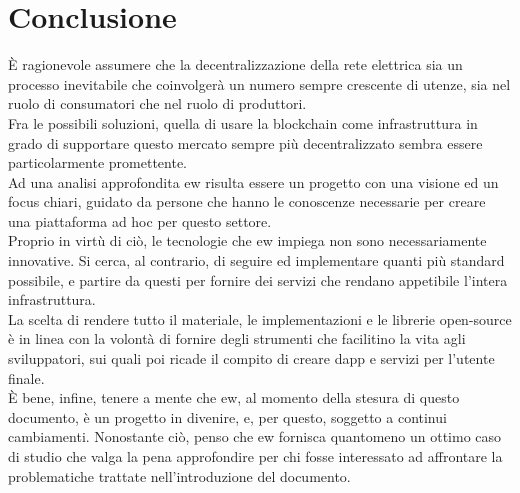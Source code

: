 \chapter*{Conclusione}
È ragionevole assumere che la decentralizzazione della rete elettrica sia un processo inevitabile che coinvolgerà un numero sempre crescente di utenze,
sia nel ruolo di consumatori che nel ruolo di produttori. \\

Fra le possibili soluzioni, quella di usare la blockchain come infrastruttura in grado di supportare questo mercato sempre più decentralizzato sembra essere particolarmente promettente. \\
Ad una analisi approfondita \gls{ew} risulta essere un progetto con una visione ed un focus chiari, guidato da persone che hanno le conoscenze necessarie per creare una piattaforma ad hoc per questo settore. \\
Proprio in virtù di ciò, le tecnologie che \gls{ew} impiega non sono necessariamente innovative.
Si cerca, al contrario, di seguire ed implementare quanti più standard possibile, e partire da questi per fornire dei servizi che rendano appetibile l'intera infrastruttura. \\
La scelta di rendere tutto il materiale, le implementazioni e le librerie open-source è in linea con la volontà di fornire degli strumenti che facilitino la vita agli sviluppatori,
sui quali poi ricade il compito di creare \gls{dapp} e servizi per l'utente finale. \\
È bene, infine, tenere a mente che \gls{ew}, al momento della stesura di questo documento, è un progetto in divenire, e, per questo, soggetto a continui cambiamenti.
Nonostante ciò, penso che \gls{ew} fornisca quantomeno un ottimo caso di studio che valga la pena approfondire per chi fosse interessato ad affrontare la problematiche trattate nell'introduzione del documento.
